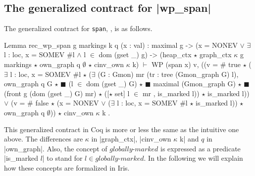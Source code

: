 \documentclass[]{scrartcl}
\def\MyMLe{\lstinline[language=MyML, basicstyle=\small\ttfamily, mathescape=true]}
\newcommand{\globmark}{\mathit{globally\text{-}marked}}
\begin{document}
\subsection{The generalized contract for \Coqe|wp_span|}
The generalized contract for \MyMLe{span}, , is as follows.
\begin{Coq}
Lemma rec_wp_span g markings k q (x : val) :
    maximal g ->
    (x = NONEV $\lor$ $\exists$ l : loc,
        x = SOMEV $\#$l $\land$ l $\in$ dom (gset _) g) ->
    (heap_ctx $\star$ graph_ctx $\kappa$ g markings $\star$ own_graph q $\emptyset$ $\star$ cinv_own $\kappa$ k)
      $\vdash$
      WP (span x)
      {{ v, ((v = $\#$ true $\star$
             ($\exists$ l : loc, x = SOMEV $\#$l $\star$
               ($\exists$ (G : Gmon) mr (tr : tree (Gmon_graph G) l),
                  own_graph q G $\star$ $\scriptscriptstyle\blacksquare$ (l $\in$ dom (gset _) G) $\star$
                  $\scriptscriptstyle\blacksquare$ maximal (Gmon_graph G) $\star$
                  $\scriptscriptstyle\blacksquare$ (front g (dom (gset _) G) mr) $\star$
                   ([$\star$ set] l $\in$ mr , is_marked l)) $\star$ is_marked l)) $\lor$
             (v = $\#$ false $\star$
              (x = NONEV $\lor$ ($\exists$ l : loc, x = SOMEV $\#$l $\star$ is_marked l))
               $\star$ own_graph q $\emptyset$))
            $\star$ cinv_own $\kappa$ k }}.
\end{Coq}

This generalized contract in Coq is more or less the same as the intuitive one above.
The differences are $\kappa$ in \Coqe|graph_ctx|, \Coqe|cinv_own $\kappa$ k|
and $q$ in \Coqe|own_graph|.
Also, the concept of $\globmark$ is expressed
as a predicate \Coqe|is_marked $l$| to stand for  $l \in \globmark$.
In the following we will explain how these concepts are formalized in Iris.
\end{document}
